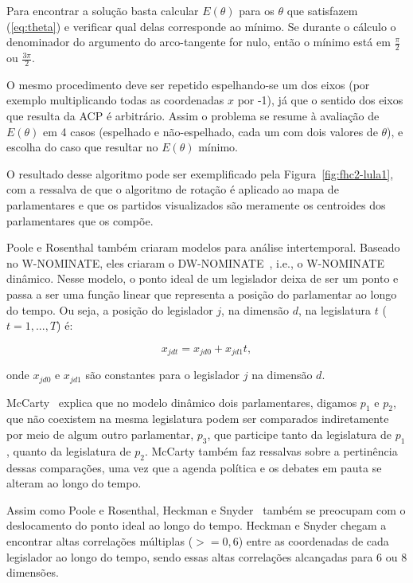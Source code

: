 \documentclass[
	article,			%
	12pt,				%
	oneside,			%
	a4paper,			%
	english,			%
	brazil,				%
	sumario=tradicional,
	oldfontcommands %
	]{abntex2}
\newcommand\wnominate{W-NOMINATE\xspace}
\begin{document}
Para encontrar a solução basta calcular $E(\theta)$ para os $\theta$ que satisfazem (\ref{eq:theta}) e verificar qual delas corresponde ao mínimo. Se durante o cálculo o denominador do argumento do arco-tangente for nulo, então o mínimo está em $\frac{\pi}{2}$ ou $\frac{3\pi}{2}$.

O mesmo procedimento deve ser repetido espelhando-se um dos eixos (por exemplo multiplicando todas as coordenadas $x$ por -1), já que o sentido dos eixos que resulta da ACP é arbitrário. Assim o problema se resume à avaliação de $E(\theta)$ em 4 casos (espelhado e não-espelhado, cada um com dois valores de $\theta$), e escolha do caso que resultar no $E(\theta)$ mínimo.

O resultado desse algoritmo pode ser exemplificado pela Figura~\ref{fig:fhc2-lula1}, com a ressalva de que o algoritmo de rotação é aplicado ao mapa de parlamentares e que os partidos visualizados são meramente os centroides dos parlamentares que os compõe.

Poole e Rosenthal também criaram modelos para análise intertemporal. Baseado no \wnominate, eles criaram o DW-NOMINATE~\cite{poole2001dnomiante}, i.e., o \wnominate dinâmico. Nesse modelo, o ponto ideal de um legislador deixa de ser um ponto e passa a ser uma função linear que representa a posição do parlamentar ao longo do tempo. Ou seja, a posição do legislador $j$, na dimensão $d$, na legislatura $t$ ($t=1,...,T$) é:

\begin{equation}
x_{jdt} = x_{jd0} + x_{jd1}t,
\label{eq:dwnominate}
\end{equation}

onde $x_{jd0}$ e $x_{jd1}$ são constantes para o legislador $j$ na dimensão $d$.

McCarty~\cite{mccarty2011measuring} explica que no modelo dinâmico dois parlamentares, digamos $p_1$ e $p_2$, que não coexistem na mesma legislatura podem ser comparados indiretamente por meio de algum outro parlamentar, $p_3$, que participe tanto da legislatura de $p_1$, quanto da legislatura de $p_2$. McCarty também faz ressalvas sobre a pertinência dessas comparações, uma vez que a agenda política e os debates em pauta se alteram ao longo do tempo.

Assim como Poole e Rosenthal, Heckman e Snyder~\cite{heckman-snyder1997} também se preocupam com o deslocamento do ponto ideal ao longo do tempo. Heckman e Snyder chegam a encontrar altas correlações múltiplas ($>= 0,6$) entre as coordenadas de cada legislador ao longo do tempo, sendo essas altas correlações alcançadas para 6 ou 8 dimensões. 
\end{document}
